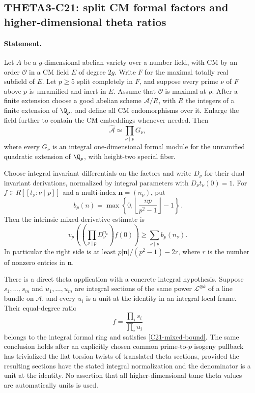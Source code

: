 \subsection{THETA3-C21: split CM formal factors and higher-dimensional theta ratios}\label{C21}

\paragraph{Statement.}
Let $A$ be a $g$-dimensional abelian variety over a number field,
with CM by an order $\mathcal O$ in a CM field $E$ of degree
$2g$.  Write $F$ for the maximal totally real subfield of $E$.
Let $p\geq5$ split completely in $F$, and suppose every prime
$\nu$ of $F$ above $p$ is unramified and inert in $E$.
Assume that $\mathcal O$ is maximal at $p$.
After a finite extension choose a good abelian scheme
$\mathcal A/R$, with $R$ the integers of a finite extension
of $\Q_p$, and define all CM endomorphisms over it.
Enlarge the field further to contain the CM embeddings whenever
needed.  Then
\begin{equation}\label{C21-formal-product}
 \widehat{\mathcal A}\simeq
       \prod_{\nu\mid p}G_\nu,
\end{equation}
where every $G_\nu$ is an integral one-dimensional formal
module for the unramified quadratic extension of $\Q_p$,
with height-two special fiber.

Choose integral invariant differentials on the factors and
write $D_\nu$ for their dual invariant derivations, normalized
by integral parameters with $D_\nu t_\nu(0)=1$.
For $f\in R[[t_\nu:\nu\mid p]]$ and a multi-index
$\mathbf n=(n_\nu)$, put
\[
 b_p(n)=\max\left\{0,
            \left\lfloor\frac{np}{p^2-1}\right\rfloor-1\right\}.
\]
Then the intrinsic mixed-derivative estimate is
\begin{equation}\label{C21-mixed-bound}
 v_p\left(\left(\prod_{\nu\mid p}D_\nu^{n_\nu}\right)f(0)\right)
       \geq\sum_{\nu\mid p}b_p(n_\nu).
\end{equation}
In particular the right side is at least
$p|\mathbf n|/(p^2-1)-2r$, where $r$ is the number of
nonzero entries in $\mathbf n$.

There is a direct theta application with a concrete integral
hypothesis.  Suppose $s_1,\ldots,s_m$ and
$u_1,\ldots,u_m$ are integral sections of the same power
$\mathscr L^{\otimes k}$ of a line bundle on $\mathcal A$,
and every $u_i$ is a unit at the identity in an integral local
frame.  Their equal-degree ratio
\begin{equation}\label{C21-section-ratio}
 f=\frac{\prod_i s_i}{\prod_i u_i}
\end{equation}
belongs to the integral formal ring and satisfies
\eqref{C21-mixed-bound}.  The same conclusion holds after
an explicitly chosen common prime-to-$p$ isogeny pullback
has trivialized the flat torsion twists of translated theta
sections, provided the resulting sections have the stated
integral normalization and the denominator is a unit at the
identity.  No assertion that all higher-dimensional tame
theta values are automatically units is used.

